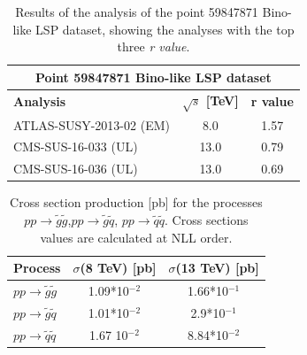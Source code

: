 \documentclass[a4paper,11pt]{article}
\newcommand{\RVALUE}{\textit{r value}}
\begin{document}
\begin{table}[!h]
	\footnotesize
	\begin{center}
		\renewcommand{\arraystretch}{1.1}
		\begin{tabular}{ l c c}  \toprule \toprule
			\multicolumn{3}{c}{Point 59847871 Bino-like LSP dataset} \\ \toprule 
			\textbf{Analysis} & \textbf{$\sqrt{s}$ [TeV]}  & \textbf{r value} \\  \toprule
			ATLAS-SUSY-2013-02 (EM) & 8.0  &  1.57 \\
			CMS-SUS-16-033 (UL) & 13.0 & 0.79 \\
			CMS-SUS-16-036 (UL) & 13.0 & 0.69 \\
			\bottomrule
		\end{tabular}
	\end{center}
	\caption{Results of the analysis of the point 59847871 Bino-like LSP dataset, showing the analyses with the top three \RVALUE. }
	\label{tab_13tev}
\end{table}
%
%
\begin{table}[!h]
	\footnotesize
	\begin{center}
		\renewcommand{\arraystretch}{1.1}
		\begin{tabular}{ l c c}  \toprule \toprule
			\textbf{Process} & $\sigma$(8 TeV) [pb]  & $\sigma$(13 TeV) [pb] \\  \toprule
			$pp \rightarrow \tilde g \tilde g$ & 1.09*10$^{-2}$ & 1.66*10$^{-1}$\\
			$pp \rightarrow \tilde g \tilde q$ & 1.01*10$^{-2}$ &  2.9*10$^{-1}$ \\
			$pp \rightarrow \tilde q \tilde q$ & 1.67 10$^{-2}$ & 8.84*10$^{-2}$ \\
			\bottomrule
		\end{tabular}
	\end{center}
	\caption{Cross section production [pb] for the processes $pp \rightarrow \tilde g \tilde g$,$pp \rightarrow \tilde g \tilde q$, $pp \rightarrow \tilde q \tilde q$. Cross sections values are calculated at NLL order.}
	\label{cross_sections}
\end{table}
\end{document}
